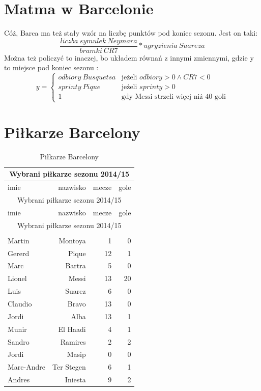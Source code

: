 \documentclass[11pt, a4paper]{article}
\begin{document}
\section{Matma w Barcelonie}
\label{sec:Matma}
Cóż, Barca ma też stały wzór na liczbę punktów pod koniec sezonu. Jest on taki:
$$\frac{liczba~symulek~Neymara}{bramki~CR7} * {ugryzienia~Suareza}$$
Można też policzyć to inaczej, bo układem równań z innymi zmiennymi, gdzie y to miejsce pod koniec sezonu :
\begin{equation}
	y = \left\{	
	\begin{array}{ll}
	odbiory~Busquetsa & \textrm{jeżeli $odbiory > 0 \land CR7 <0$} \\
	sprinty~Pique & \textrm{jeżeli $sprinty > 0 $} \\
	1 & \textrm{gdy Messi strzeli więcj niż 40 goli}
		
	\end{array} \right.
	\label{eq:nr1}
\end{equation}
\section{Piłkarze Barcelony}
\label{sec:Pilkarze}
\begin{longtable}{|l|r|r|r|}
\caption{Piłkarze Barcelony}\\\hline
\multicolumn{4}{|c|}{Wybrani piłkarze sezonu 2014/15}\\\hline
imie & nazwisko & mecze & gole \\ \hline
\endfirsthead
\hline
\multicolumn{4}{|c|}{Wybrani piłkarze sezonu 2014/15}\\
imie & nazwisko & mecze & gole \\ \hline
\endhead
\hline \multicolumn{4}{|c|}{Wybrani piłkarze sezonu 2014/15}\\ \hline
\endfoot
\hline \multicolumn{4}{|c|}{Wybrani piłkarze sezonu 2014/15}\\
\hline
\endlastfoot
Martin & Montoya & 1 & 0 \\
Gererd  & Pique & 12 & 1 \\
Marc & Bartra & 5 & 0 \\
Lionel & Messi & 13 & 20 \\
Luis  & Suarez & 6 & 0 \\
Claudio & Bravo & 13 & 0 \\
Jordi & Alba & 13 & 1 \\
Munir  & El Haadi & 4 & 1 \\
Sandro & Ramires & 2 & 2 \\
Jordi & Masip & 0 & 0 \\
Marc-Andre  & Ter Stegen & 6 & 1 \\
Andres & Iniesta & 9 & 2 \\
\end{longtable}
\end{document}
